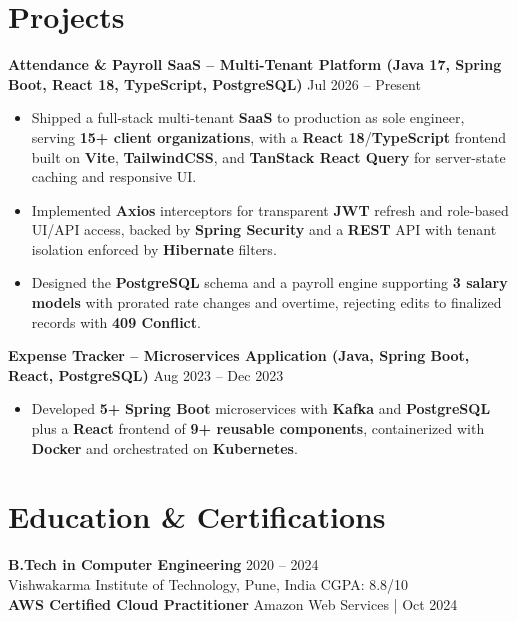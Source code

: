 \documentclass[a4paper,10pt]{article}
\begin{document}
\section*{Projects}

\textbf{Attendance \& Payroll SaaS -- Multi-Tenant Platform (Java 17, Spring Boot, React 18, TypeScript, PostgreSQL)} \hfill Jul 2026 -- Present
\begin{itemize}[leftmargin=*]
    \item Shipped a full-stack multi-tenant \textbf{SaaS} to production as sole engineer, serving \textbf{15+ client organizations}, with a \textbf{React 18}/\textbf{TypeScript} frontend built on \textbf{Vite}, \textbf{TailwindCSS}, and \textbf{TanStack React Query} for server-state caching and responsive UI.
    \item Implemented \textbf{Axios} interceptors for transparent \textbf{JWT} refresh and role-based UI/API access, backed by \textbf{Spring Security} and a \textbf{REST} API with tenant isolation enforced by \textbf{Hibernate} filters.
    \item Designed the \textbf{PostgreSQL} schema and a payroll engine supporting \textbf{3 salary models} with prorated rate changes and overtime, rejecting edits to finalized records with \textbf{409 Conflict}.
\end{itemize}

\textbf{Expense Tracker -- Microservices Application (Java, Spring Boot, React, PostgreSQL)} \hfill Aug 2023 -- Dec 2023
\begin{itemize}[leftmargin=*]
    \item Developed \textbf{5+} \textbf{Spring Boot} microservices with \textbf{Kafka} and \textbf{PostgreSQL} plus a \textbf{React} frontend of \textbf{9+ reusable components}, containerized with \textbf{Docker} and orchestrated on \textbf{Kubernetes}.
\end{itemize}

\section*{Education \& Certifications}
\textbf{B.Tech in Computer Engineering} \hfill 2020 -- 2024 \\
Vishwakarma Institute of Technology, Pune, India \hfill CGPA: 8.8/10 \\
\textbf{AWS Certified Cloud Practitioner} \hfill Amazon Web Services \;|\; Oct 2024
\end{document}
